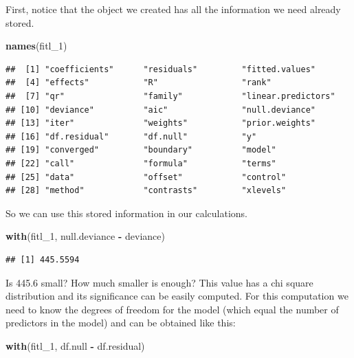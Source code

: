 \documentclass[]{book}
\newenvironment{Shaded}{\begin{snugshade}}{\end{snugshade}}
\newcommand{\DecValTok}[1]{\textcolor[rgb]{0.00,0.00,0.81}{#1}}
\newcommand{\KeywordTok}[1]{\textcolor[rgb]{0.13,0.29,0.53}{\textbf{#1}}}
\newcommand{\NormalTok}[1]{#1}
\newcommand{\OperatorTok}[1]{\textcolor[rgb]{0.81,0.36,0.00}{\textbf{#1}}}
\newcommand{\StringTok}[1]{\textcolor[rgb]{0.31,0.60,0.02}{#1}}
\theoremstyle{definition}
\theoremstyle{definition}
\theoremstyle{definition}
\theoremstyle{remark}
\begin{document}
First, notice that the object we created has all the information we need
already stored.

\begin{Shaded}
\begin{Highlighting}[]
\KeywordTok{names}\NormalTok{(fitl_}\DecValTok{1}\NormalTok{)}
\end{Highlighting}
\end{Shaded}

\begin{verbatim}
##  [1] "coefficients"      "residuals"         "fitted.values"    
##  [4] "effects"           "R"                 "rank"             
##  [7] "qr"                "family"            "linear.predictors"
## [10] "deviance"          "aic"               "null.deviance"    
## [13] "iter"              "weights"           "prior.weights"    
## [16] "df.residual"       "df.null"           "y"                
## [19] "converged"         "boundary"          "model"            
## [22] "call"              "formula"           "terms"            
## [25] "data"              "offset"            "control"          
## [28] "method"            "contrasts"         "xlevels"
\end{verbatim}

So we can use this stored information in our calculations.

\begin{Shaded}
\begin{Highlighting}[]
\KeywordTok{with}\NormalTok{(fitl_}\DecValTok{1}\NormalTok{, null.deviance }\OperatorTok{-}\StringTok{ }\NormalTok{deviance)}
\end{Highlighting}
\end{Shaded}

\begin{verbatim}
## [1] 445.5594
\end{verbatim}

Is 445.6 small? How much smaller is enough? This value has a chi square
distribution and its significance can be easily computed. For this
computation we need to know the degrees of freedom for the model (which
equal the number of predictors in the model) and can be obtained like
this:

\begin{Shaded}
\begin{Highlighting}[]
\KeywordTok{with}\NormalTok{(fitl_}\DecValTok{1}\NormalTok{, df.null }\OperatorTok{-}\StringTok{ }\NormalTok{df.residual)}
\end{Highlighting}
\end{Shaded}
\end{document}
